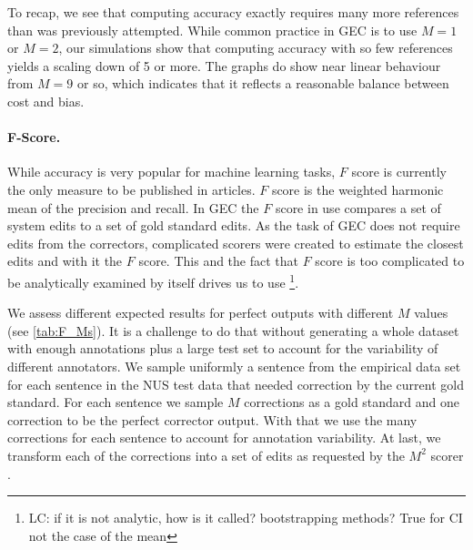 \documentclass[english]{article}
\newcommand{\lc}[1]{\footnote{\color{green}LC: #1}}
\begin{document}
 To recap, we see that computing accuracy exactly requires many more references than was previously attempted.
 While common practice in GEC is to use $M=1$ or $M=2$, our simulations show that computing accuracy with
 so few references yields a scaling down of 5 or more. The graphs do show near linear behaviour from $M=9$ or
 so, which indicates that it reflects a reasonable balance between cost and bias.
 
 \paragraph{F-Score.}

 While accuracy is very popular for machine learning tasks, $F$ score is currently the
 only measure to be published in articles. $F$ score is the weighted harmonic mean of the precision and recall. In GEC the $F$ score in use compares a set of system edits to a set of gold standard edits. As the task of GEC does not require edits from the correctors, complicated scorers \cite{dahlmeier2012better} were created to estimate the closest edits and with it the $F$ score. This and the fact that $F$ score is too complicated to be analytically examined by itself  \cite{yeh2000more} drives us to use \lc{if it is not analytic, how is it called? bootstrapping methods? True for CI not the case of the mean}.
 
 We assess different expected results for perfect outputs with different $M$ values (see \ref{tab:F_Ms}).
 It is a challenge to do that without generating a whole dataset with enough annotations plus a large test
 set to account for the variability of different annotators. We sample uniformly a sentence from the
 empirical data set for each sentence in the NUS test data that needed correction by the current gold standard.
 For each sentence we sample $M$ corrections as a gold standard and one correction to be the perfect corrector
 output. With that we use the many corrections for each sentence to account for annotation variability.
 At last, we transform each of the corrections into a set of edits as requested
 by the $M^2$ scorer \cite{dahlmeier2012better}.  
\end{document}
